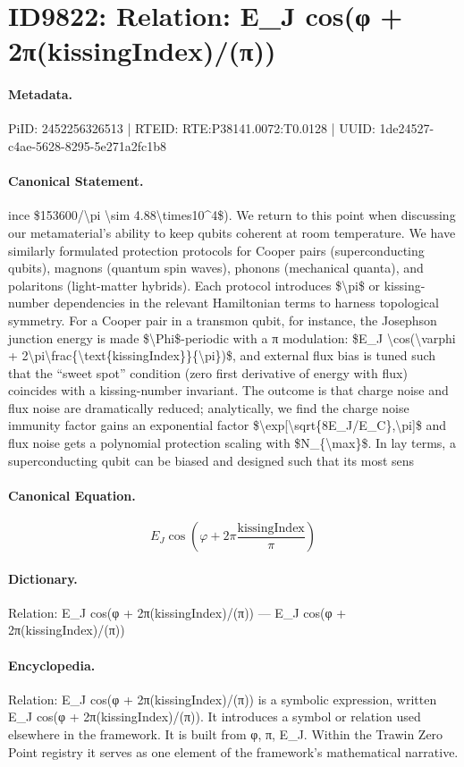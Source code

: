\section*{ID9822: Relation: E\_J cos(φ + 2π(kissingIndex)/(π))}
\paragraph{Metadata.}
PiID: 2452256326513 | RTEID: RTE:P38141.0072:T0.0128 | UUID: 1de24527-c4ae-5628-8295-5e271a2fc1b8

\paragraph{Canonical Statement.}
ince \$153600/\textbackslash{}pi \textbackslash{}sim 4.88\textbackslash{}times10\textasciicircum{}4\$). We return to this point when discussing our metamaterial’s ability to keep qubits coherent at room temperature. We have similarly formulated protection protocols for Cooper pairs (superconducting qubits), magnons (quantum spin waves), phonons (mechanical quanta), and polaritons (light-matter hybrids). Each protocol introduces \$\textbackslash{}pi\$ or kissing-number dependencies in the relevant Hamiltonian terms to harness topological symmetry. For a Cooper pair in a transmon qubit, for instance, the Josephson junction energy is made \$\textbackslash{}Phi\$-periodic with a π modulation: \$E\_J \textbackslash{}cos(\textbackslash{}varphi + 2\textbackslash{}pi\textbackslash{}frac\{\textbackslash{}text\{kissingIndex\}\}\{\textbackslash{}pi\})\$, and external flux bias is tuned such that the “sweet spot” condition (zero first derivative of energy with flux) coincides with a kissing-number invariant. The outcome is that charge noise and flux noise are dramatically reduced; analytically, we find the charge noise immunity factor gains an exponential factor \$\textbackslash{}exp[\textbackslash{}sqrt\{8E\_J/E\_C\},\textbackslash{}pi]\$ and flux noise gets a polynomial protection scaling with \$N\_\{\textbackslash{}max\}\$. In lay terms, a superconducting qubit can be biased and designed such that its most sens

\paragraph{Canonical Equation.}
\[
E_J \cos(\varphi + 2\pi\frac{\text{kissingIndex}}{\pi})
\]

\paragraph{Dictionary.}
Relation: E\_J cos(φ + 2π(kissingIndex)/(π)) — E\_J cos(φ + 2π(kissingIndex)/(π))

\paragraph{Encyclopedia.}
Relation: E\_J cos(φ + 2π(kissingIndex)/(π)) is a symbolic expression, written E\_J cos(φ + 2π(kissingIndex)/(π)). It introduces a symbol or relation used elsewhere in the framework. It is built from φ, π, E\_J. Within the Trawin Zero Point registry it serves as one element of the framework's mathematical narrative.
